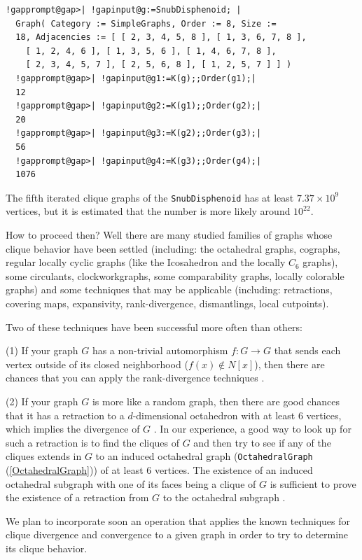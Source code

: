 \documentclass[a4paper,11pt]{report}
\begin{document}
{{ 
\begin{Verbatim}[commandchars=!@|,fontsize=\small,frame=single,label=Example]
  !gapprompt@gap>| !gapinput@g:=SnubDisphenoid; |
  Graph( Category := SimpleGraphs, Order := 8, Size := 
  18, Adjacencies := [ [ 2, 3, 4, 5, 8 ], [ 1, 3, 6, 7, 8 ], 
    [ 1, 2, 4, 6 ], [ 1, 3, 5, 6 ], [ 1, 4, 6, 7, 8 ], 
    [ 2, 3, 4, 5, 7 ], [ 2, 5, 6, 8 ], [ 1, 2, 5, 7 ] ] )
  !gapprompt@gap>| !gapinput@g1:=K(g);;Order(g1);|
  12
  !gapprompt@gap>| !gapinput@g2:=K(g1);;Order(g2);|
  20
  !gapprompt@gap>| !gapinput@g3:=K(g2);;Order(g3);|
  56
  !gapprompt@gap>| !gapinput@g4:=K(g3);;Order(g4);|
  1076
\end{Verbatim}
 

The fifth iterated clique graphs of the \texttt{SnubDisphenoid} has at least $7.37\times 10^9$ vertices, but it is estimated that the number is more likely around $10^{22}$. 

How to proceed then? Well there are many studied families of graphs whose
clique behavior have been settled (including: the octahedral graphs, cographs,
regular locally cyclic graphs (like the Icosahedron and the locally $C_6$ graphs), some circulants, clockworkgraphs, some comparability graphs, locally
colorable graphs) and some techniques that may be applicable (including:
retractions, covering maps, expansivity, rank-divergence, dismantlings, local
cutpoints). 

Two of these techniques have been successful more often than others: 

(1) If your graph $G$ has a non-trivial automorphism $f:G\rightarrow G$ that sends each vertex outside of its closed neighborhood ($f(x)\not\in N[x]$), then there are chances that you can apply the rank-divergence techniques \cite{LNP06}\cite{LNP09}. 

(2) If your graph $G$ is more like a random graph, then there are good chances that it has a
retraction to a $d$-dimensional octahedron with at least 6 vertices, which implies the divergence
of $G$ \cite{Neu78}. In our experience, a good way to look up for such a retraction is to find
the cliques of $G$ and then try to see if any of the cliques extends in $G$ to an induced octahedral graph (\texttt{OctahedralGraph} (\ref{OctahedralGraph})) of at least 6 vertices. The existence of an induced octahedral subgraph with
one of its faces being a clique of $G$ is sufficient to prove the existence of a retraction from $G$ to the octahedral subgraph \cite{Kah09}\cite{LPV08b}. 

We plan to incorporate soon an operation that applies the known techniques for
clique divergence and convergence to a given graph in order to try to
determine its clique behavior. }

 }
\end{document}
